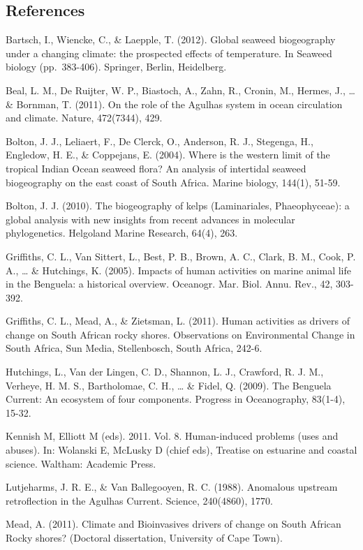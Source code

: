 \documentclass[12pt,]{article}
\begin{document}
\subsection{References}\label{references}

Bartsch, I., Wiencke, C., \& Laepple, T. (2012). Global seaweed
biogeography under a changing climate: the prospected effects of
temperature. In Seaweed biology (pp.~383-406). Springer, Berlin,
Heidelberg.

Beal, L. M., De Ruijter, W. P., Biastoch, A., Zahn, R., Cronin, M.,
Hermes, J., \ldots{} \& Bornman, T. (2011). On the role of the Agulhas
system in ocean circulation and climate. Nature, 472(7344), 429.

Bolton, J. J., Leliaert, F., De Clerck, O., Anderson, R. J., Stegenga,
H., Engledow, H. E., \& Coppejans, E. (2004). Where is the western limit
of the tropical Indian Ocean seaweed flora? An analysis of intertidal
seaweed biogeography on the east coast of South Africa. Marine biology,
144(1), 51-59.

Bolton, J. J. (2010). The biogeography of kelps (Laminariales,
Phaeophyceae): a global analysis with new insights from recent advances
in molecular phylogenetics. Helgoland Marine Research, 64(4), 263.

Griffiths, C. L., Van Sittert, L., Best, P. B., Brown, A. C., Clark, B.
M., Cook, P. A., \ldots{} \& Hutchings, K. (2005). Impacts of human
activities on marine animal life in the Benguela: a historical overview.
Oceanogr. Mar. Biol. Annu. Rev., 42, 303-392.

Griffiths, C. L., Mead, A., \& Zietsman, L. (2011). Human activities as
drivers of change on South African rocky shores. Observations on
Environmental Change in South Africa, Sun Media, Stellenbosch, South
Africa, 242-6.

Hutchings, L., Van der Lingen, C. D., Shannon, L. J., Crawford, R. J.
M., Verheye, H. M. S., Bartholomae, C. H., \ldots{} \& Fidel, Q. (2009).
The Benguela Current: An ecosystem of four components. Progress in
Oceanography, 83(1-4), 15-32.

Kennish M, Elliott M (eds). 2011. Vol. 8. Human-induced problems (uses
and abuses). In: Wolanski E, McLusky D (chief eds), Treatise on
estuarine and coastal science. Waltham: Academic Press.

Lutjeharms, J. R. E., \& Van Ballegooyen, R. C. (1988). Anomalous
upstream retroflection in the Agulhas Current. Science, 240(4860), 1770.

Mead, A. (2011). Climate and Bioinvasives drivers of change on South
African Rocky shores? (Doctoral dissertation, University of Cape Town).
\end{document}
